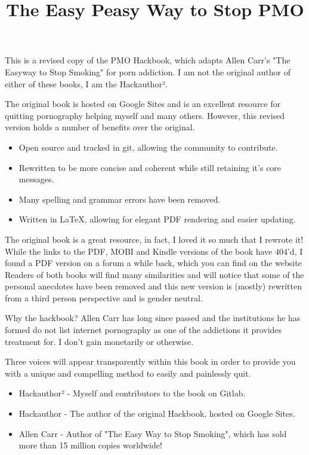 \documentclass[easypeasy.tex]{subfiles}
\title{The Easy Peasy Way to Stop PMO}
\begin{document}
\maketitle

This is a revised copy of the PMO Hackbook, which adapts Allen Carr's "The Easyway to Stop Smoking" for porn addiction. I am not the original author of either of these books, I am the Hackauthor².

The original book is hosted on Google Sites and is an excellent resource for quitting pornography helping myself and many others. However, this revised version holds a number of benefits over the original.
\begin{itemize}
\item Open source and tracked in git, allowing the community to contribute.
\item Rewritten to be more concise and coherent while still retaining it's core messages.
\item Many spelling and grammar errors have been removed.
\item Written in LaTeX, allowing for elegant PDF rendering and easier updating.
\end{itemize}
The original book is a great resource, in fact, I loved it so much that I rewrote it! While the links to the PDF, MOBI and Kindle versions of the book have 404'd, I found a PDF version on a forum a while back, which you can find on the website Readers of both books will find many similarities and will notice that some of the personal anecdotes have been removed and this new version is (mostly) rewritten from a third person perspective and is gender neutral.

Why the hackbook? Allen Carr has long since passed and the institutions he has formed do not list internet pornography as one of the addictions it provides treatment for. I don't gain monetarily or otherwise.

Three voices will appear transparently within this book in order to provide you with a unique and compelling method to easily and painlessly quit.
\begin{itemize}
  \item Hackauthor² - Myself and contributors to the book on Gitlab.
  \item Hackauthor - The author of the original Hackbook, hosted on Google Sites.
  \item Allen Carr - Author of "The Easy Way to Stop Smoking", which has sold more than 15 million copies worldwide!
\end{itemize}
\end{document}
